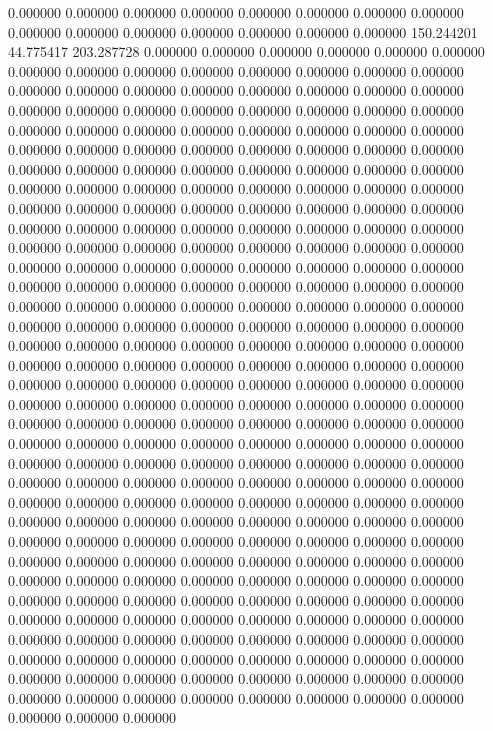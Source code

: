 0.000000 0.000000 0.000000
0.000000 0.000000 0.000000
0.000000 0.000000 0.000000
0.000000 0.000000 0.000000
0.000000 0.000000 0.000000
150.244201 44.775417 203.287728
0.000000 0.000000 0.000000
0.000000 0.000000 0.000000
0.000000 0.000000 0.000000
0.000000 0.000000 0.000000
0.000000 0.000000 0.000000
0.000000 0.000000 0.000000
0.000000 0.000000 0.000000
0.000000 0.000000 0.000000
0.000000 0.000000 0.000000
0.000000 0.000000 0.000000
0.000000 0.000000 0.000000
0.000000 0.000000 0.000000
0.000000 0.000000 0.000000
0.000000 0.000000 0.000000
0.000000 0.000000 0.000000
0.000000 0.000000 0.000000
0.000000 0.000000 0.000000
0.000000 0.000000 0.000000
0.000000 0.000000 0.000000
0.000000 0.000000 0.000000
0.000000 0.000000 0.000000
0.000000 0.000000 0.000000
0.000000 0.000000 0.000000
0.000000 0.000000 0.000000
0.000000 0.000000 0.000000
0.000000 0.000000 0.000000
0.000000 0.000000 0.000000
0.000000 0.000000 0.000000
0.000000 0.000000 0.000000
0.000000 0.000000 0.000000
0.000000 0.000000 0.000000
0.000000 0.000000 0.000000
0.000000 0.000000 0.000000
0.000000 0.000000 0.000000
0.000000 0.000000 0.000000
0.000000 0.000000 0.000000
0.000000 0.000000 0.000000
0.000000 0.000000 0.000000
0.000000 0.000000 0.000000
0.000000 0.000000 0.000000
0.000000 0.000000 0.000000
0.000000 0.000000 0.000000
0.000000 0.000000 0.000000
0.000000 0.000000 0.000000
0.000000 0.000000 0.000000
0.000000 0.000000 0.000000
0.000000 0.000000 0.000000
0.000000 0.000000 0.000000
0.000000 0.000000 0.000000
0.000000 0.000000 0.000000
0.000000 0.000000 0.000000
0.000000 0.000000 0.000000
0.000000 0.000000 0.000000
0.000000 0.000000 0.000000
0.000000 0.000000 0.000000
0.000000 0.000000 0.000000
0.000000 0.000000 0.000000
0.000000 0.000000 0.000000
0.000000 0.000000 0.000000
0.000000 0.000000 0.000000
0.000000 0.000000 0.000000
0.000000 0.000000 0.000000
0.000000 0.000000 0.000000
0.000000 0.000000 0.000000
0.000000 0.000000 0.000000
0.000000 0.000000 0.000000
0.000000 0.000000 0.000000
0.000000 0.000000 0.000000
0.000000 0.000000 0.000000
0.000000 0.000000 0.000000
0.000000 0.000000 0.000000
0.000000 0.000000 0.000000
0.000000 0.000000 0.000000
0.000000 0.000000 0.000000
0.000000 0.000000 0.000000
0.000000 0.000000 0.000000
0.000000 0.000000 0.000000
0.000000 0.000000 0.000000
0.000000 0.000000 0.000000
0.000000 0.000000 0.000000
0.000000 0.000000 0.000000
0.000000 0.000000 0.000000
0.000000 0.000000 0.000000
0.000000 0.000000 0.000000
0.000000 0.000000 0.000000
0.000000 0.000000 0.000000
0.000000 0.000000 0.000000
0.000000 0.000000 0.000000
0.000000 0.000000 0.000000
0.000000 0.000000 0.000000
0.000000 0.000000 0.000000
